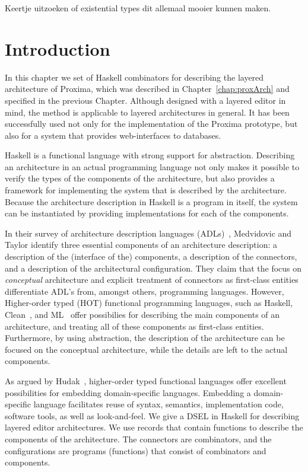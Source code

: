 \documentclass[preprint,natbib]{sigplanconf}
\begin{document}
Keertje uitzoeken of existential types dit allemaal mooier kunnen maken.
\ec

\section{Introduction}\label{sect:introduction}

In this chapter we set of Haskell combinators for describing the layered architecture of Proxima, which was described in Chapter~\ref{chap:proxArch} and specified in the previous Chapter. Although designed with a layered editor in mind, the method is applicable to layered architectures in general. It has been successfully used not only for the implementation of the Proxima prototype, but also for a system that provides web-interfaces to databases. 

Haskell is a functional language with strong support for abstraction. Describing an architecture in an actual programming language not only makes it possible to verify the types of the components of the architecture, but also provides a framework for implementing the system that is described by the architecture. Because the architecture description in Haskell is a program in itself, the system can be instantiated by providing implementations for each of the components.

In their survey of architecture description languages (ADLs)~\cite{medvidovic00ADLs}, Medvidovic and Taylor identify three essential components of an architecture description: a description of the (interface of the) components, a description of the connectors, and a description of the architectural configuration. They claim that the focus on {\em conceptual} architecture and explicit treatment of connectors as first-class entities differentiate ADL's from, amongst others, programming languages. However, Higher-order typed (HOT) functional programming languages, such as Haskell, Clean~\cite{plasmeijer01clean}, and ML~\cite{milner97ML} offer possibilies for describing the main components of an architecture, and treating all of these components as first-class entities. Furthermore, by using abstraction, the description of the architecture can be focused on the conceptual architecture, while the details are left to the actual components.

As argued by Hudak~\cite{hudak98DSLs}, higher-order typed functional languages offer excellent possibilities for embedding domain-specific languages. Embedding a domain-specific language facilitates reuse of syntax, semantics, implementation code, software tools, as well as look-and-feel. We give a DSEL in Haskell for describing layered editor architectures. We use records that contain functions to describe the components of the architecture. The connectors are combinators, and the configurations are programs (functions) that consist of combinators and components. 
\end{document}
